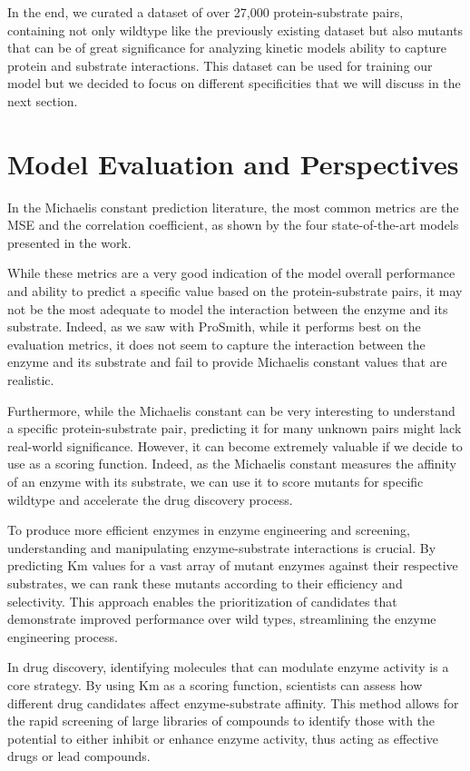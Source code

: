 In the end, we curated a dataset of over 27,000 protein-substrate pairs, containing not only wildtype like the
previously existing dataset but also mutants that can be of great significance for analyzing kinetic models
ability to capture protein and substrate interactions. This dataset can be used for training our model but we
decided to focus on different specificities that we will discuss in the next section.

\section{Model Evaluation and Perspectives}

In the Michaelis constant prediction literature, the most common metrics are the MSE and the correlation
coefficient, as shown by the four state-of-the-art models presented in the work. 

While these metrics are a very good indication of the model overall performance and ability to predict a 
specific value based on the protein-substrate pairs, it may not be the most adequate to model the interaction
between the enzyme and its substrate. Indeed, as we saw with ProSmith, while it performs best on the evaluation
metrics, it does not seem to capture the interaction between the enzyme and its substrate and fail to provide
Michaelis constant values that are realistic.

Furthermore, while the Michaelis constant can be very interesting to understand a specific protein-substrate
pair, predicting it for many unknown pairs might lack real-world significance. However, it can become
extremely valuable if we decide to use as a scoring function. Indeed, as the Michaelis constant measures the
affinity of an enzyme with its substrate, we can use it to score mutants for specific wildtype and accelerate
the drug discovery process. 

To produce more efficient enzymes in enzyme engineering and screening, understanding and manipulating 
enzyme-substrate interactions is crucial. By predicting Km values for a vast 
array of mutant enzymes against their respective substrates, we can rank these mutants 
according to their efficiency and selectivity. This approach enables the prioritization of 
candidates that demonstrate improved performance over wild types, streamlining the enzyme engineering process.

In drug discovery, identifying molecules that can modulate enzyme activity is a core strategy. 
By using Km as a scoring function, scientists can assess how different drug candidates affect 
enzyme-substrate affinity. This method allows for the rapid screening of large libraries of compounds 
to identify those with the potential to either inhibit or enhance enzyme activity, thus acting as 
effective drugs or lead compounds.


